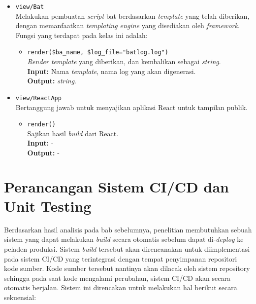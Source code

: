 \begin{itemize}
        \item \texttt{view/Bat} \\
            Melakukan pembuatan \textit{script} bat berdasarkan \textit{template} yang telah diberikan,
            dengan memanfaatkan \textit{templating engine} yang disediakan oleh \textit{framework}.
            Fungsi yang terdapat pada kelas ini adalah:
            \begin{itemize}
                \item \texttt{render(\$ba\_name, \$log\_file="batlog.log")} \\
                    \textit{Render template} yang diberikan, dan kembalikan sebagai \textit{string}. \\
                    \textbf{Input:} Nama \textit{template}, nama log yang akan digenerasi.\\
                    \textbf{Output:} \textit{string}.
            \end{itemize}
        
        \item \texttt{view/ReactApp} \\
            Bertanggung jawab untuk menyajikan aplikasi React untuk tampilan publik.
            \begin{itemize}
                \item \texttt{render()} \\
                    Sajikan hasil \textit{build} dari React. \\
                    \textbf{Input:} -\\
                    \textbf{Output:} -
            \end{itemize}
    \end{itemize}

\section{Perancangan Sistem CI/CD dan Unit Testing}
    Berdasarkan hasil analisis pada bab sebelumnya, penelitian membutuhkan sebuah sistem yang dapat
    melakukan \textit{build} secara otomatis sebelum dapat di-\textit{deploy} ke peladen produksi.
    Sistem \textit{build} tersebut akan direncanakan untuk diimplementasi pada sistem CI/CD yang
    terintegrasi dengan tempat penyimpanan repositori kode sumber. 
    Kode sumber tersebut nantinya akan
    dilacak oleh sistem repository sehingga pada saat kode mengalami perubahan, sistem CI/CD akan
    secara otomatis berjalan. Sistem ini direncakan untuk melakukan hal berikut secara sekuensial:
    
